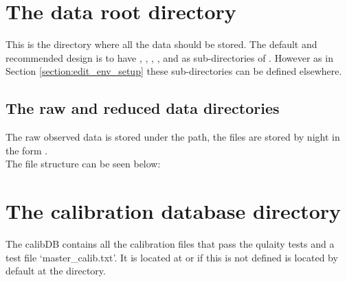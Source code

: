 \section{The data root directory}
\label{section:data_root_folder}

This is the directory where all the data should be stored. The default and recommended design is to have , , , 
, and  as sub-directories of . However as in Section \ref{section:edit_env_setup} these sub-directories can be defined elsewhere.

\newpage

\subsection{The raw and reduced data directories}
\label{section:data_root_folder:raw_folder}
The raw observed data is stored under the  path, the files are stored by night in the form \constantFolderDateFormat. \\

\noindent The file structure can be seen below:

\section{The calibration database directory}
\label{section:data_root_folder:calibDB}


The calibDB contains all the calibration files that pass the qulaity tests and a test file `master\_calib.txt'. It is located at  or if this is not defined is located by default at the  directory.

